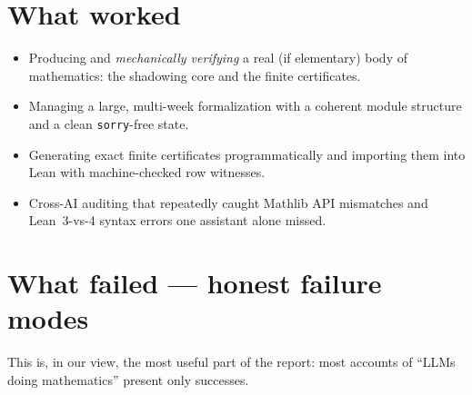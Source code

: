 \documentclass[11pt,a4paper]{article}
\theoremstyle{definition}
\begin{document}
\section{What worked}
\label{sec:worked}

\begin{itemize}[leftmargin=2em]
  \item Producing and \emph{mechanically verifying} a real (if elementary)
        body of mathematics: the shadowing core and the finite certificates.
  \item Managing a large, multi-week formalization with a coherent module
        structure and a clean \texttt{sorry}-free state.
  \item Generating exact finite certificates programmatically and importing
        them into Lean with machine-checked row witnesses.
  \item Cross-AI auditing that repeatedly caught Mathlib API mismatches and
        Lean~3-vs-4 syntax errors one assistant alone missed.
\end{itemize}

\section{What failed --- honest failure modes}
\label{sec:failed}

This is, in our view, the most useful part of the report: most accounts of
``LLMs doing mathematics'' present only successes.
\end{document}
